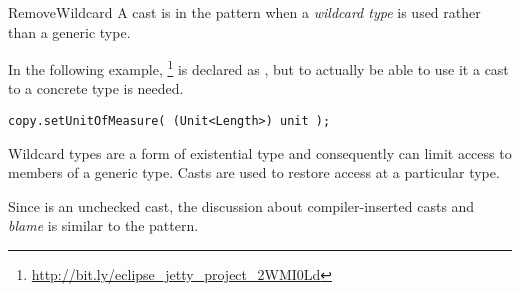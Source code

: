\begin{pattern}{RemoveWildcard}
A cast is in the \thisp{} pattern when a \emph{wildcard type} is used rather than a generic type.


\instances{}
In the following example,%
\footnote{\url{http://bit.ly/eclipse_jetty_project_2WMI0Ld}}
 is declared as ,
but to actually be able to use it a cast to a concrete type is needed.

\begin{verbatim}
copy.setUnitOfMeasure( (Unit<Length>) unit );
\end{verbatim}


\discussion{}
Wildcard types are a form of existential type and consequently can limit
access to members of a generic type.
Casts are used to restore access at a particular type.

Since \thisp{} is an unchecked cast,
the discussion about compiler-inserted casts and \emph{blame} is similar to the  pattern.

\end{pattern}
